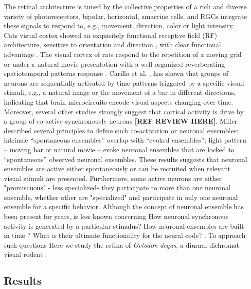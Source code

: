\documentclass[9pt,twocolumn,twoside,lineno]{pnas-new}
\begin{document}
The retinal architecture is tuned by  the collective properties of a rich and diverse variety of photoreceptors, bipolar, horizontal, amacrine cells, and RGCs integrate these signals to respond to, e.g., movement, direction, color or light intensity. Cats visual cortex showed an exquisitely functional receptive field (RF) architecture, sensitive to orientation and direction \citep{Rose:1977fg}, with clear functional advantage \citep{Ohki:2005ce}. The visual cortex of rats respond to the repetition of a moving grid or under a natural movie presentation with a well organized reverberating spatiotemporal patterns response \citep{Han:2008hw}. Carillo et al. \citep{CarrilloReid:2015fm}, has shown that groups of neurons are sequentially activated by time patterns triggered by a specific visual stimuli, e.g., a natural image or the movement of a bar in different directions, indicating that brain microcircuits encode visual aspects changing over time. Moreover, several other studies strongly suggest that cortical activity is drive by a group of co-active synchronously neurons \textbf{[REF REVIEW HERE]}. Miller \citep{Miller:2014eq} described several principles to define such co-activation or neuronal ensembles: intrinsic “spontaneous ensembles” overlap with “evoked ensembles”; light pattern – moving bar or natural movie – evoke neuronal ensembles that are locked to “spontaneous” observed neuronal ensembles.
These results suggests that neuronal ensembles are active either  spontaneously or can be recruited when relevant visual stimuli are presented. Furthermore, some active neurons are either "promiscuous" - less specialized- they participate to more than one neuronal ensemble, whether other are "specialized" and participate in only one neuronal ensemble for a specific behavior. Although the concept of neuronal ensemble has been present for years, is less known concerning How neuronal synchronous activity is generated by a particular stimulus? How neuronal ensembles are built in time ? What is their ultimate functionality for the neural code? \citep{CarrilloReid:2016jn, CarrilloReid:2015fm}. To approach such questions Here we study the retina of \textit{Octodon degus}, a diurnal dichromat visual rodent \citep{Chavez:2003bn}.

\subsection*{Results}
\end{document}
